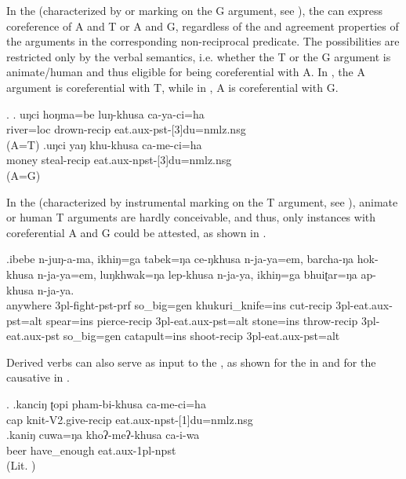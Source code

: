 In the  (characterized by  or  marking on the G argument, see ), the  can express coreference of A and T or A and G, regardless of the  and agreement properties of the arguments in the corresponding  non-reciprocal predicate. The possibilities are restricted only by the verbal semantics, i.e. whether the T or the G argument is animate/human and thus eligible for being coreferential with A.  In \Next[a], the A argument  is coreferential with T, while in \Next[b], A is coreferential with G.

\ex. \ag.	uŋci hoŋma=be luŋ-khusa ca-ya-ci=ha\\
		 river{\sc =loc} drown-{\sc recip}   eat{\sc .aux-pst-[3]du=nmlz.nsg}\\
	 (A=T)
 	\bg.uŋci yaŋ khu-khusa ca-me-ci=ha\\
	 money steal{\sc -recip} eat{\sc .aux-npst-[3]du=nmlz.nsg}\\
	 (A=G)
	
	
In the  (characterized by instrumental marking on the T argument, see ), animate or human T arguments are hardly conceivable, and thus, only instances with coreferential A and G could be attested, as shown in \Next.
	
	
\exg.ibebe n-juŋ-a-ma,   ikhiŋ=ga tabek=ŋa ce-ŋkhusa  n-ja-ya=em,  barcha-ŋa  hok-khusa  n-ja-ya=em, luŋkhwak=ŋa lep-khusa n-ja-ya, ikhiŋ=ga bhuiʈar=ŋa ap-khusa n-ja-ya.\\
	anywhere {\sc 3pl-}fight{\sc -pst-prf} so\_big{\sc =gen}  khukuri\_knife{\sc =ins} cut{\sc -recip} {\sc 3pl-}eat{\sc .aux-pst=alt} spear{\sc =ins} pierce{\sc -recip} {\sc 3pl-}eat{\sc .aux-pst=alt} stone{\sc =ins} throw{\sc -recip} {\sc 3pl-}eat{\sc .aux-pst} so\_big{\sc =gen} catapult{\sc =ins} shoot{\sc -recip} {\sc 3pl-}eat{\sc .aux-pst=alt}\\
	 
	

Derived verbs can also serve as input to the , as shown for the  in \Next[a] and for the causative in \Next[b].

	\ex. \ag.kanciŋ ʈopi pham-bi-khusa ca-me-ci=ha\\
	  cap knit{\sc -V2.give-recip} eat{\sc .aux-npst-[1]du=nmlz.nsg}		\\
	 \bg.kaniŋ cuwa=ŋa khoʔ-meʔ-khusa ca-i-wa\\
	 beer have\_enough eat{\sc .aux-1pl-npst}\\
	 (Lit. )



